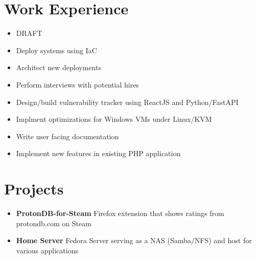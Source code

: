 \documentclass{resume}
\begin{document}
\section{Work Experience}

\begin{itemize}
    \item DRAFT
    \item Deploy systems using IaC
    \item Architect new deployments
    \item Perform interviews with potential hires
\end{itemize}

\begin{itemize}
    \item Design/build vulnerability tracker using ReactJS and Python/FastAPI
    \item Implment optimizations for Windows VMs under Linux/KVM
    \item Write user facing documentation
    \item Implement new features in existing PHP application
\end{itemize}

\section{Projects}
\begin{itemize}
    \item \textbf{ProtonDB-for-Steam} Firefox extension that shows ratings from\\
    protondb.com on Steam

    \item \textbf{Home Server} Fedora Server serving as a NAS (Samba/NFS) and host for various applications
\end{itemize}
\end{document}
